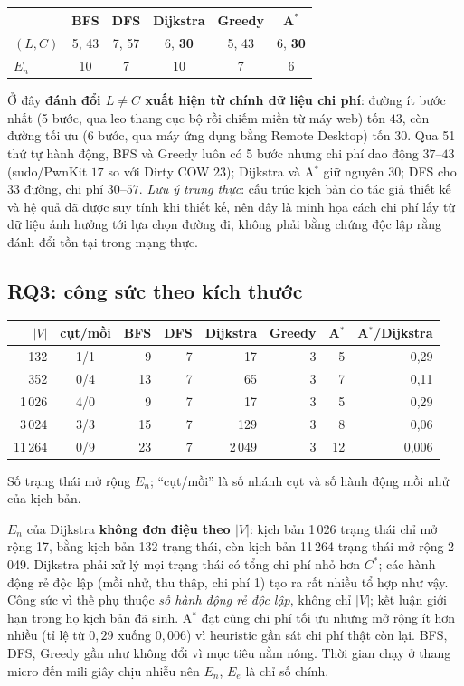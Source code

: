 \documentclass[11pt,a4paper]{article}
\newcommand{\Cs}{C^{*}}
\newcommand{\V}{|V|}
\newcommand{\En}{E_{n}}
\begin{document}
\begin{center}\small
\begin{tabular}{@{}lccccc@{}}
\toprule
 & BFS & DFS & Dijkstra & Greedy & A$^{*}$ \\
\midrule
$(L,C)$ & 5, 43 & 7, 57 & 6, \textbf{30} & 5, 43 & 6, \textbf{30} \\
$\En$   & 10    & 7     & 10            & 7     & 6 \\
\bottomrule
\end{tabular}
\end{center}

Ở đây \textbf{đánh đổi $L\neq C$ xuất hiện từ chính dữ liệu chi phí}: đường ít bước nhất (5 bước, qua leo thang cục bộ rồi chiếm miền từ máy web) tốn $43$, còn đường tối ưu (6 bước, qua máy ứng dụng bằng Remote Desktop) tốn $30$. Qua 51 thứ tự hành động, BFS và Greedy luôn có 5 bước nhưng chi phí dao động $37$--$43$ (sudo/PwnKit $17$ so với Dirty COW $23$); Dijkstra và A$^{*}$ giữ nguyên $30$; DFS cho 33 đường, chi phí $30$--$57$. \emph{Lưu ý trung thực}: cấu trúc kịch bản do tác giả thiết kế và hệ quả đã được suy tính khi thiết kế, nên đây là minh họa cách chi phí lấy từ dữ liệu ảnh hưởng tới lựa chọn đường đi, không phải bằng chứng độc lập rằng đánh đổi tồn tại trong mạng thực.

\subsection{RQ3: công sức theo kích thước}

\begin{center}\small
\begin{tabular}{@{}rcrrrrrr@{}}
\toprule
$\V$ & cụt/mồi & BFS & DFS & Dijkstra & Greedy & A$^{*}$ & A$^{*}$/Dijkstra \\
\midrule
132    & 1/1 & 9  & 7 & 17     & 3 & 5  & 0,29 \\
352    & 0/4 & 13 & 7 & 65     & 3 & 7  & 0,11 \\
1\,026 & 4/0 & 9  & 7 & 17     & 3 & 5  & 0,29 \\
3\,024 & 3/3 & 15 & 7 & 129    & 3 & 8  & 0,06 \\
11\,264& 0/9 & 23 & 7 & 2\,049 & 3 & 12 & 0,006 \\
\bottomrule
\end{tabular}
\end{center}
{\footnotesize Số trạng thái mở rộng $\En$; ``cụt/mồi'' là số nhánh cụt và số hành động mồi nhử của kịch bản.}

$\En$ của Dijkstra \textbf{không đơn điệu theo $\V$}: kịch bản 1\,026 trạng thái chỉ mở rộng 17, bằng kịch bản 132 trạng thái, còn kịch bản 11\,264 trạng thái mở rộng 2\,049. Dijkstra phải xử lý mọi trạng thái có tổng chi phí nhỏ hơn $\Cs$; các hành động rẻ độc lập (mồi nhử, thu thập, chi phí 1) tạo ra rất nhiều tổ hợp như vậy. Công sức vì thế phụ thuộc \emph{số hành động rẻ độc lập}, không chỉ $\V$; kết luận giới hạn trong họ kịch bản đã sinh. A$^{*}$ đạt cùng chi phí tối ưu nhưng mở rộng ít hơn nhiều (tỉ lệ từ $0{,}29$ xuống $0{,}006$) vì heuristic gần sát chi phí thật còn lại. BFS, DFS, Greedy gần như không đổi vì mục tiêu nằm nông. Thời gian chạy ở thang micro đến mili giây chịu nhiễu nên $\En$, $E_e$ là chỉ số chính.
\end{document}
